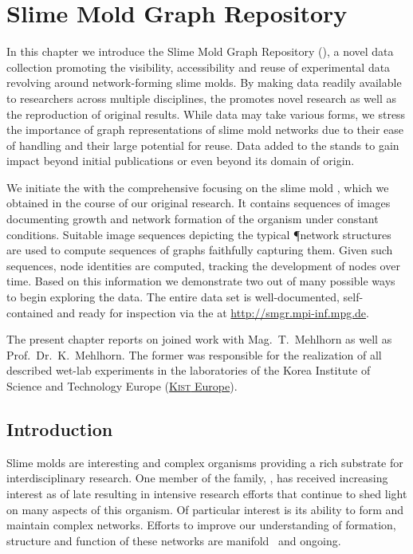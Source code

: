 \chapter{Slime Mold Graph Repository}\label{chap:smgr}

	In this chapter we introduce the Slime Mold Graph Repository (\SMGR), a novel data collection promoting the visibility, accessibility and reuse of experimental data revolving around network-forming slime molds. By making data readily available to researchers across multiple disciplines, the \SMGR promotes novel research as well as the reproduction of original results. While \SMGR data may take various forms, we stress the importance of graph representations of slime mold networks due to their ease of handling and their large potential for reuse. Data added to the \SMGR stands to gain impact beyond initial publications or even beyond its domain of origin. 

	We initiate the \SMGR with the comprehensive \data focusing on the slime mold \Pp, which we obtained in the course of our original research. It contains sequences of images documenting growth and network formation of the organism under constant conditions. Suitable image sequences depicting the typical \P network structures are used to compute sequences of graphs faithfully capturing them. Given such sequences, node identities are computed, tracking the development of nodes over time. Based on this information we demonstrate two out of many possible ways to begin exploring the data. The entire data set is well-documented, self-contained and ready for inspection via the \SMGR at \href{http://smgr.mpi-inf.mpg.de}{http://smgr.mpi-inf.mpg.de}.

	The present chapter reports on joined work with Mag.~T.~Mehlhorn as well as Prof.~Dr.~K.~Mehlhorn. The former was responsible for the realization of all described wet-lab experiments in the laboratories of the Korea Institute of Science and Technology Europe (\href{www.kist-europe.de}{\textsc{Kist} Europe}).

\section{Introduction}

	Slime molds are interesting and complex organisms providing a rich substrate for interdisciplinary research. One member of the family, \Pp, has received increasing interest as of late resulting in intensive research efforts that continue to shed light on many aspects of this organism. Of particular interest is its ability to form and maintain complex networks. Efforts to improve our understanding of formation, structure and function of these networks are manifold~\cite{Marwan419,tero2010rules,alim2013random,baumgarten2010plasmodial,baumgarten2013functional} and ongoing.

